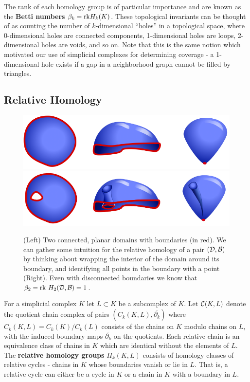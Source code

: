 The rank of each homology group is of particular importance and are known as the \textbf{Betti numbers} $\beta_k = \mathrm{rk} H_k(K)$.
These topological invariants can be thought of as counting the number of $k$-dimensional ``holes'' in a topological space, where 0-dimensional holes are connected components, 1-dimensional holes are loops, 2-dimensional holes are voids, and so on.
Note that this is the same notion which motivated our use of simplicial complexes for determining coverage - a 1-dimensional hole exists if a gap in a neighborhood graph cannot be filled by triangles.

\subsection{Relative Homology}

\begin{figure}[htbp]
\centering
    \includegraphics[scale=0.5]{figures/balloons1.png}\vspace{2ex}
    \includegraphics[scale=0.5]{figures/balloons3.png}
    \caption{(Left) Two connected, planar domains with boundaries (in red).
            We can gather some intuition for the relative homology of a pair $({\mathcal{D}},{\mathcal{B}})$ by thinking about wrapping the interior of the domain around its boundary, and identifying all points in the boundary with a point (Right).
            Even with disconnected boundaries we know that $\beta_2 = \mathrm{rk}~ H_2({\mathcal{D}}, {\mathcal{B}}) = 1$.}
    \label{fig:balloons1}
\end{figure}

For a simplicial complex $K$ let $L\subset K$ be a subcomplex of $K$.
Let $\mathcal{C}(K, L)$ denote the quotient chain complex of pairs $(C_k(K, L), \overline{\partial_k})$ where $C_k(K, L) = C_k(K)/C_k(L)$ consists of the chains on $K$ modulo chains on $L$, with the induced boundary maps $\overline{\partial_k}$ on the quotients.
Each relative chain is an equivalence class of chains in $K$ which are identical without the elements of $L$.
The \textbf{relative homology groups} $H_k(K, L)$ consists of homology classes of relative cycles - chains in $K$ whose boundaries vanish or lie in $L$.
That is, a relative cycle can either be a cycle in $K$ or a chain in $K$ with a boundary in $L$.

